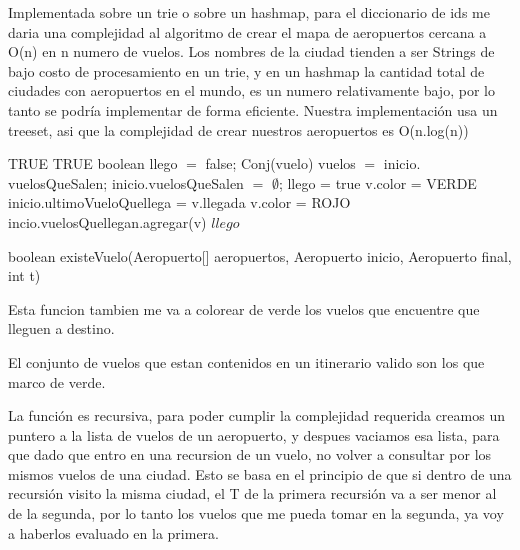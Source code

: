 Implementada sobre un trie o sobre un hashmap, para el diccionario de ids me daria una complejidad al algoritmo de crear el mapa de aeropuertos cercana a O(n) en n numero de vuelos. Los nombres de la ciudad tienden a ser Strings de bajo costo de procesamiento en un trie, y en un hashmap la cantidad total de ciudades con aeropuertos en el mundo, es un numero relativamente bajo, por lo tanto se podr\'ia implementar de forma eficiente.
Nuestra implementaci\'on usa un treeset, asi que la complejidad de crear nuestros aeropuertos es O(n.log(n))

\begin{algorithm}[H]
\begin{algorithmic}[1]
		\RETURN TRUE
\ENDIF
{}	
		\RETURN TRUE
\ENDIF
\STATE boolean llego $=$ false;
\STATE Conj(vuelo) vuelos $=$ inicio$.$vuelosQueSalen;
\STATE inicio$.$vuelosQueSalen $=$ $\emptyset$;
				\STATE llego = true
				\STATE v.color = VERDE
					\STATE inicio.ultimoVueloQuellega = v.llegada
				\ENDIF
			\ELSE
				\STATE v.color = ROJO								
	    		\ENDIF    			
		\ENDIF
	\ELSE
		\STATE incio.vuelosQuellegan.agregar(v)										    
    \ENDIF
\ENDFOR
\RETURN $llego$
\caption{boolean existeVuelo(Aeropuerto[] aeropuertos, Aeropuerto inicio, Aeropuerto final, int t)}%
\end{algorithmic}
\end{algorithm}

Esta funcion tambien me va a colorear de verde los vuelos que encuentre que lleguen a destino.

El conjunto de vuelos que estan contenidos en un itinerario valido son los que marco de verde.

La funci\'on es recursiva, para poder cumplir la complejidad requerida creamos un puntero a la lista de vuelos de un aeropuerto, y despues vaciamos esa lista, para que dado que entro en una recursion de un vuelo, no volver a consultar por los mismos vuelos de una ciudad. Esto se basa en el principio de que si dentro de una recursi\'on visito la misma ciudad, el T de la primera recursi\'on va a ser menor al de la segunda, por lo tanto los vuelos que me pueda tomar en la segunda, ya voy a haberlos evaluado en la primera.

